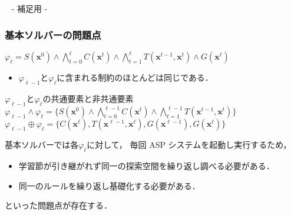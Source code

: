 \appendix
\backupbegin

\begin{frame}{~}
 \centering
 - 補足用 -
\end{frame} 

\begin{frame}\frametitle{基本ソルバーの問題点}

  \begin{block}{}
    \centering
    $
      \varphi_{\ell} = S(\bm{x}^0)
      \land \bigwedge_{t=0}^{\ell} C(\bm{x}^t) 
      \land \bigwedge_{t=1}^{\ell} T(\bm{x}^{t-1},\bm{x}^{t})
      \land G(\bm{x}^\ell)
    $
  \end{block}
  
  \begin{itemize}
    \item $\varphi_{\ell-1}$と$\varphi_{\ell}$に含まれる制約のほとんどは同じである．
  \end{itemize}

  \begin{block}{$\varphi_{\ell-1}$と$\varphi_{\ell}$の共通要素と非共通要素}
    \centering
    $
      \varphi_{\ell -1} \land \varphi_{\ell} =
      \{S(\bm{x}^0) \land \bigwedge_{t=0}^{\ell-1} C(\bm{x}^t)
      \land \bigwedge_{t=1}^{\ell-1} T(\bm{x}^{t-1},\bm{x}^{t})\}
    $
    $
      \varphi_{\ell -1} \oplus \varphi_{\ell} = 
      \{C(\bm{x}^{\ell}), T(\bm{x}^{\ell -1}, 
      \bm{x}^{\ell}), G(\bm{x}^{\ell -1}), G(\bm{x}^{\ell})\}
    $
  \end{block}
  \pause
  \bigskip

  基本ソルバーでは各$\varphi_{\ell}$に対して，
  毎回 ASP システムを起動し実行するため，
  \begin{itemize}
    \item 学習節が引き継がれず同一の探索空間を繰り返し調べる必要がある．
    \item 同一のルールを繰り返し基礎化する必要がある．
  \end{itemize}
  といった問題点が存在する．

\end{frame}

